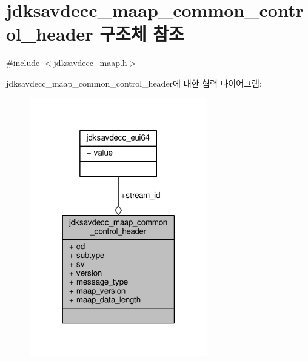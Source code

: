 \hypertarget{structjdksavdecc__maap__common__control__header}{}\section{jdksavdecc\+\_\+maap\+\_\+common\+\_\+control\+\_\+header 구조체 참조}
\label{structjdksavdecc__maap__common__control__header}


{\ttfamily \#include $<$jdksavdecc\+\_\+maap.\+h$>$}



jdksavdecc\+\_\+maap\+\_\+common\+\_\+control\+\_\+header에 대한 협력 다이어그램\+:
\nopagebreak
\begin{figure}[H]
\begin{center}
\leavevmode
\includegraphics[width=218pt]{structjdksavdecc__maap__common__control__header__coll__graph}
\end{center}
\end{figure}
